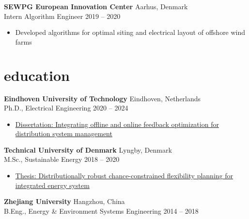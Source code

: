 \documentclass[12pt]{article}
\newcommand{\entry}[4]{{{\textbf{#1}}} \hfill #3 \\ #2 \hfill #4}
\begin{document}
\begin{paracol}{2}

\entry{SEWPG European Innovation Center}{Intern Algorithm Engineer}{Aarhus, Denmark}{2019 -- 2020}
\begin{itemize}[noitemsep,leftmargin=3.5mm,rightmargin=0mm,topsep=6pt]
  \item Developed algorithms for optimal siting and electrical layout of offshore wind farms
\end{itemize}






\section{education}

\entry{Eindhoven University of Technology}{Ph.D., Electrical Engineering}{Eindhoven, Netherlands}{2020 -- 2024}
\begin{itemize}[noitemsep,leftmargin=3.5mm,rightmargin=0mm,topsep=6pt]
  \item \href{https://research.tue.nl/en/publications/integrating-offline-and-online-feedback-optimization-for-distribu}{Dissertation: Integrating offline and online feedback optimization for distribution system management}
\end{itemize}


\entry{Technical University of Denmark}{M.Sc., Sustainable Energy}{Lyngby, Denmark}{2018 -- 2020}
\begin{itemize}[noitemsep,leftmargin=3.5mm,rightmargin=0mm,topsep=6pt]
  \item \href{https://doi.org/10.1016/j.ijepes.2021.107417}{Thesis: Distributionally robust chance-constrained flexibility planning for integrated energy system}
\end{itemize}


\entry{Zhejiang University}{B.Eng., Energy \& Environment Systems Engineering}{Hangzhou, China}{2014 -- 2018}



\end{paracol}
\end{document}
